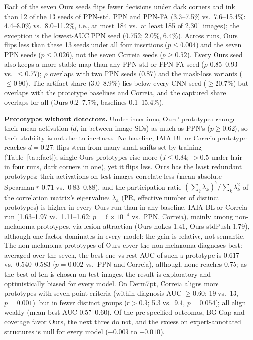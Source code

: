 \documentclass[conference]{IEEEtran}
\begin{document}
Each of the seven Ours seeds flips fewer decisions under dark corners and ink than 12 of the 13 seeds of PPN-std, PPN and PPN-FA (3.3--7.5\% vs.\ 7.6--15.4\%; 4.4--8.0\% vs.\ 8.0--11.2\%, i.e., at most 184 vs.\ at least 185 of 2{,}301 images); the exception is the lowest-AUC PPN seed (0.752; 2.0\%, 6.4\%). Across runs, Ours flips less than these 13 seeds under all four insertions ($p\leq0.004$) and the seven PPN seeds ($p\leq0.026$), not the seven Correia seeds ($p\geq0.62$). Every Ours seed also keeps a more stable map than any PPN-std or PPN-FA seed ($\rho$ 0.85--0.93 vs.\ $\leq$0.77); $\rho$ overlaps with two PPN seeds (0.87) and the mask-loss variants ($\leq$0.90). The artifact share (3.0--8.9\%) lies below every CNN seed ($\geq$20.7\%) but overlaps with the prototype baselines and Correia, and the captured share overlaps for all (Ours 0.2--7.7\%, baselines 0.1--15.4\%).

\textbf{Prototypes without detectors.} Under insertions, Ours' prototypes change their mean activation ($d$, in between-image SDs) as much as PPN's ($p\geq0.62$), so their stability is not due to inertness. No baseline, IAIA-BL or Correia prototype reaches $d=0.27$: flips stem from many small shifts set by training (Table~\ref{tab:fact}); single Ours prototypes rise more ($d\leq0.84$; $>0.5$ under hair in four runs, dark corners in one), yet it flips less. Ours has the least redundant prototypes: their activations on test images correlate less (mean absolute Spearman $r$ 0.71 vs.\ 0.83--0.88), and the participation ratio $(\sum_k\lambda_k)^2/\sum_k\lambda_k^2$ of the correlation matrix's eigenvalues $\lambda_k$ (PR, effective number of distinct prototypes) is higher in every Ours run than in any baseline, IAIA-BL or Correia run (1.63--1.97 vs.\ 1.11--1.62; $p=6\times10^{-4}$ vs.\ PPN, Correia), mainly among non-melanoma prototypes, via lesion attraction (Ours-noLes 1.41, Ours-stdPush 1.79), although one factor dominates in every model: the gain is relative, not semantic. The non-melanoma prototypes of Ours cover the non-melanoma diagnoses best: averaged over the seven, the best one-vs-rest AUC of such a prototype is 0.617 vs.\ 0.540--0.583 ($p=0.002$ vs.\ PPN and Correia), although none reaches 0.75; as the best of ten is chosen on test images, the result is exploratory and optimistically biased for every model. On Derm7pt, Correia aligns more prototypes with seven-point criteria (within-diagnosis AUC $\geq$0.60; 19 vs.\ 13, $p=0.001$), but in fewer distinct groups ($r>0.9$; 5.3 vs.\ 9.4, $p=0.054$); all align weakly (mean best AUC 0.57--0.60). Of the pre-specified outcomes, BG-Gap and coverage favor Ours, the next three do not, and the excess on expert-annotated structures is null for every model ($-0.009$ to $+0.010$).
\end{document}

